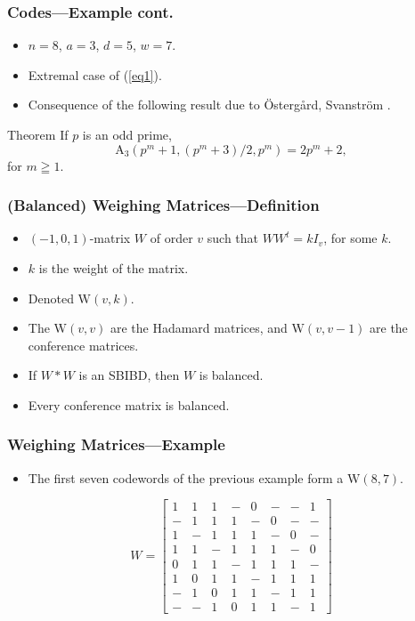 \documentclass{beamer}
\newcommand{\M}{\mathrm{A}}
\newcommand{\w}{\mathrm{W}}
\begin{document}
\begin{frame}
 \frametitle{Codes---Example cont.}
 \begin{itemize}
  \item $n=8$, $a=3$, $d=5$, $w=7$.
  \item Extremal case of (\ref{eq1}).
  \item Consequence of the following result due to \"{O}sterg\r{a}rd, Svanstr\"{o}m \cite{cont-tern-code}.
 \end{itemize}
 \begin{block}{Theorem}
  If $p$ is an odd prime,
  \begin{equation}\label{eq2}
  \M_3(p^m+1,(p^m+3)/2,p^m) = 2p^m+2,
  \end{equation}
  for $m \geqq 1$.
 \end{block}
\end{frame}

\begin{frame}
 \frametitle{(Balanced) Weighing Matrices---Definition}
 \begin{itemize}
  \item $(-1,0,1)$-matrix $W$ of order $v$ such that $WW^t = kI_v$, for some $k$.
  \item $k$ is the weight of the matrix.
  \item Denoted $\w(v,k)$.
  \item The $\w(v,v)$ are the Hadamard matrices, and $\w(v,v-1)$ are the conference matrices.
  \item If $W*W$ is an SBIBD, then $W$ is balanced.
  \item Every conference matrix is balanced.
 \end{itemize}
\end{frame}

\begin{frame}
 \frametitle{Weighing Matrices---Example}
 \begin{itemize}
  \item The first seven codewords of the previous example form a $\w(8,7)$.
 \end{itemize}
 $$
 W=\begin{bmatrix}
    1 & 1 & 1 & - & 0 & - & - & 1 \\ 
- & 1 & 1 & 1 & - & 0 & - & - \\
1 & - & 1 & 1 & 1 & - & 0 & - \\ 
1 & 1 & - & 1 & 1 & 1 & - & 0 \\ 
0 & 1 & 1 & - & 1 & 1 & 1 & - \\ 
1 & 0 & 1 & 1 & - & 1 & 1 & 1 \\ 
- & 1 & 0 & 1 & 1 & - & 1 & 1 \\ 
- & - & 1 & 0 & 1 & 1 & - & 1
   \end{bmatrix}
 $$
\end{frame}
 
\end{document}
